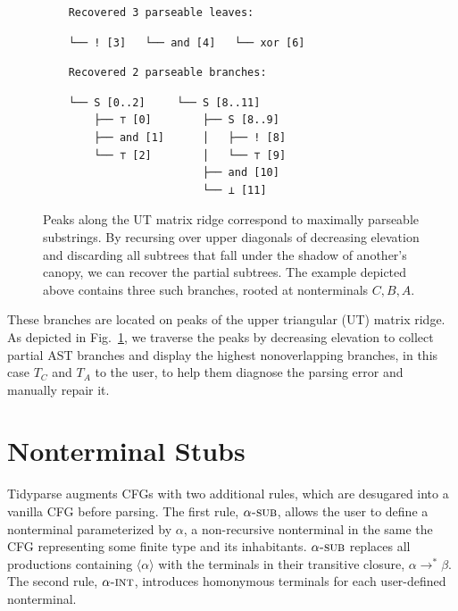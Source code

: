 \documentclass[sigplan,review,anonymous,acmsmall]{acmart}\settopmatter{printfolios=false,printccs=false,printacmref=false}
\begin{document}
\begin{figure}[H]
\begin{minipage}[l]{6cm}
      \begin{verbatim}
    Recovered 3 parseable leaves:
      \end{verbatim}
      \noindent\hspace{0.64cm}\hspace{1.70cm}\hspace{1.98cm}\vspace{-5pt}
      \begin{verbatim}
    └── ! [3]   └── and [4]   └── xor [6]
      \end{verbatim}

      \begin{verbatim}
    Recovered 2 parseable branches:
      \end{verbatim}
    \hspace{0.64cm}\hspace{2.51cm}\vspace{-5pt}
      \begin{verbatim}
    └── S [0..2]     └── S [8..11]
        ├── ⊤ [0]        ├── S [8..9]
        ├── and [1]      │   ├── ! [8]
        └── ⊤ [2]        │   └── ⊤ [9]
                         ├── and [10]
                         └── ⊥ [11]
      \end{verbatim}
    \end{minipage}
  \caption{Peaks along the UT matrix ridge correspond to maximally parseable substrings. By recursing over upper diagonals of decreasing elevation and discarding all subtrees that fall under the shadow of another's canopy, we can recover the partial subtrees. The example depicted above contains three such branches, rooted at nonterminals $C, B, A$.}\label{fig:peaks}
\end{figure}

\noindent These branches are located on peaks of the upper triangular (UT) matrix ridge. As depicted in Fig.~\ref{fig:peaks}, we traverse the peaks by decreasing elevation to collect partial AST branches and display the highest nonoverlapping branches, in this case $T_C$ and $T_A$ to the user, to help them diagnose the parsing error and manually repair it.

\pagebreak\section{Nonterminal Stubs}

Tidyparse augments CFGs with two additional rules, which are desugared into a vanilla CFG before parsing. The first rule, $\alpha\textsc{-sub}$, allows the user to define a nonterminal parameterized by $\alpha$, a non-recursive nonterminal in the same the CFG representing some finite type and its inhabitants. $\alpha\textsc{-sub}$ replaces all productions containing $\langle\alpha\rangle$ with the terminals in their transitive closure, $\alpha \rightarrow^* \beta$. The second rule, $\alpha\textsc{-int}$, introduces homonymous terminals for each user-defined nonterminal.
\end{document}
